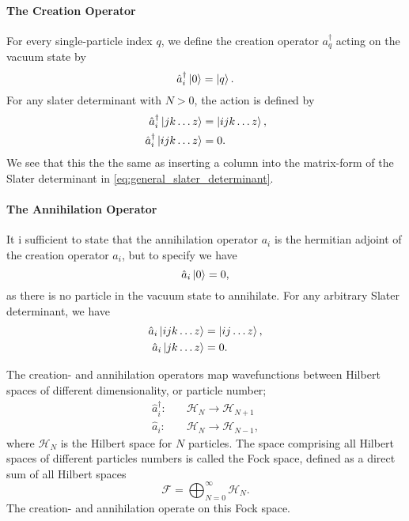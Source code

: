     \paragraph{The Creation Operator}
    For every single-particle index $q$,
    we define the creation operator
    $a_q^\dagger$ acting on the vacuum state by
    \begin{equation}
        \hat{a}_i^\dagger \ket{0} = \ket{q}.
    \end{equation}
    For any slater determinant with $N > 0$, the action is defined by
    \begin{align}
        \hat{a}_i^\dagger\ket{jk \dots z} &= \ket{ijk \dots z}, \\
        \hat{a}_i^\dagger\ket{ijk \dots z} &= 0.
    \end{align}
    We see that this the the same as inserting a column into the matrix-form of the 
    Slater determinant in \autoref{eq:general_slater_determinant}.

    \paragraph{The Annihilation Operator}
    It i sufficient to state that the 
    annihilation operator $a_i$ is the hermitian adjoint of the creation operator
    $\hat{a}_i$, but to specify we have
    \begin{equation}
        \hat{a}_i\ket{0} = 0,
    \end{equation}
    as there is no particle in the vacuum state to annihilate. 
    For any arbitrary Slater determinant, we have 
    \begin{align}
        \hat{a}_i \ket{ijk \dots z} &= \ket{ij \dots z}, \\
        \hat{a}_i \ket{jk \dots z} &= 0.
    \end{align}

    The creation- and annihilation operators map wavefunctions between Hilbert spaces of 
    different dimensionality, or particle number;
    \begin{align}
        \hat{a}^\dagger_i: &\quad \mathcal{H}_N \to \mathcal{H}_{N+1} \\
        \hat{a}_i: &\quad \mathcal{H}_N \to \mathcal{H}_{N-1},
    \end{align}
    where $\mathcal{H}_N$ is the Hilbert space for $N$ particles. The space comprising
    all Hilbert spaces of different particles numbers is called the Fock space, defined 
    as a direct sum of all Hilbert spaces
    \begin{equation}
        \mathscr{F} = \bigoplus_{N=0}^\infty \mathcal{H}_N.
    \end{equation}
    The creation- and annihilation operate on this Fock space.


